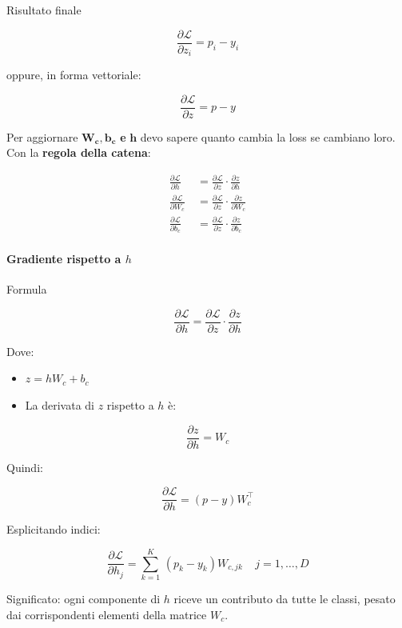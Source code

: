 \documentclass[
  11pt,
]{article}
\begin{document}
Risultato finale

\[\frac{\partial\mathcal{L}}{\partial z_{i}} = p_{i} - y_{i}\]

oppure, in forma vettoriale:

\[\frac{\partial\mathcal{L}}{\partial z} = p - y\]

Per aggiornare
\(\mathbf{W}_{\mathbf{c}}\mathbf{,}\mathbf{b}_{\mathbf{c}}\) \textbf{e}
\(\mathbf{h}\) devo sapere quanto cambia la loss se cambiano loro.\\
Con la \textbf{regola della catena}:

\[\begin{matrix}
\frac{\partial\mathcal{L}}{\partial h} & \  = \frac{\partial\mathcal{L}}{\partial z} \cdot \frac{\partial z}{\partial h} \\
\frac{\partial\mathcal{L}}{\partial W_{c}} & \  = \frac{\partial\mathcal{L}}{\partial z} \cdot \frac{\partial z}{\partial W_{c}} \\
\frac{\partial\mathcal{L}}{\partial b_{c}} & \  = \frac{\partial\mathcal{L}}{\partial z} \cdot \frac{\partial z}{\partial b_{c}}
\end{matrix}\]

\paragraph{Gradiente rispetto a $h$}


Formula

\[\frac{\partial\mathcal{L}}{\partial h} = \frac{\partial\mathcal{L}}{\partial z} \cdot \frac{\partial z}{\partial h}\]

Dove:


\begin{itemize}
\item
  \(z = hW_{c} + b_{c}\)
\item
  La derivata di \(z\) rispetto a \(h\) è:
\end{itemize}


\[\frac{\partial z}{\partial h} = W_{c}\]


Quindi:


\[\frac{\partial\mathcal{L}}{\partial h} = (p - y)W_{c}^{\top}\]


Esplicitando indici:


\[\frac{\partial\mathcal{L}}{\partial h_{j}} = \sum_{k = 1}^{K}\,\left( p_{k} - y_{k} \right)W_{c,jk}\ \ \ \ \ j = 1,\ldots,D\]

Significato: ogni componente di \(h\) riceve un contributo da tutte le
classi, pesato dai corrispondenti elementi della matrice \(W_{c}\).
\end{document}
